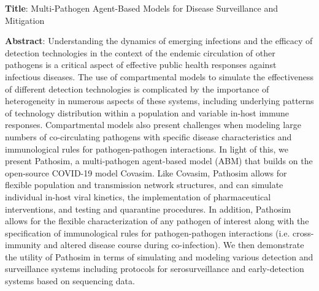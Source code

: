 \textbf{Title}: Multi-Pathogen Agent-Based Models for Disease
Surveillance and Mitigation

\textbf{Abstract}: Understanding the dynamics of emerging infections and
the efficacy of detection technologies in the context of the endemic
circulation of other pathogens is a critical aspect of effective public
health responses against infectious diseases. The use of compartmental
models to simulate the effectiveness of different detection technologies
is complicated by the importance of heterogeneity in numerous aspects of
these systems, including underlying patterns of technology distribution
within a population and variable in-host immune responses. Compartmental
models also present challenges when modeling large numbers of
co-circulating pathogens with specific disease characteristics and
immunological rules for pathogen-pathogen interactions. In light of
this, we present Pathosim, a multi-pathogen agent-based model (ABM) that
builds on the open-source COVID-19 model Covasim. Like Covasim, Pathosim
allows for flexible population and transmission network structures, and
can simulate individual in-host viral kinetics, the implementation of
pharmaceutical interventions, and testing and quarantine procedures. In
addition, Pathosim allows for the flexible characterization of any
pathogen of interest along with the specification of immunological rules
for pathogen-pathogen interactions (i.e. cross-immunity and altered
disease course during co-infection). We then demonstrate the utility of
Pathosim in terms of simulating and modeling various detection and
surveillance systems including protocols for serosurveillance and
early-detection systems based on sequencing data.
